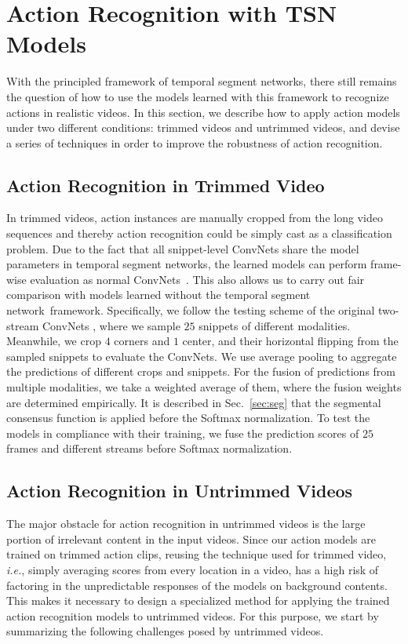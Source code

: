 \documentclass[10pt,journal,compsoc]{IEEEtran}
\newcommand{\SEGNET}{temporal segment network}
\begin{document}
\section{Action Recognition with TSN Models}

With the principled framework of \SEGNET s, there still remains the question of how to use the models learned with this framework to recognize actions in realistic videos. In this section, we describe how to apply action models under two different conditions: trimmed videos and untrimmed videos, and devise a series of techniques in order to improve the robustness of action recognition. 

\subsection{Action Recognition in Trimmed Video}
In trimmed videos, action instances are manually cropped from the long video sequences and thereby action recognition could be simply cast as a classification problem.   
Due to the fact that all snippet-level ConvNets share the model parameters in \SEGNET s, the learned models can perform frame-wise evaluation as normal ConvNets~\cite{SimonyanZ14}.
This also allows us to carry out fair comparison with models learned without the \SEGNET~framework. 
Specifically, we follow the testing scheme of the original two-stream ConvNets \cite{SimonyanZ14}, where we sample $ 25 $ snippets of different modalities. Meanwhile, we crop $ 4 $ corners and $ 1 $ center, and their horizontal flipping from the sampled snippets to evaluate the ConvNets. We use average pooling to aggregate the predictions of different crops and snippets.
For the fusion of predictions from multiple modalities, we take a weighted average of them, where the fusion weights are determined empirically.
It is described in Sec.~\ref{sec:seg} that the segmental consensus function is applied before the Softmax normalization.
To test the models in compliance with their training, we fuse the prediction scores of $ 25 $ frames and different streams before Softmax normalization.

\subsection{Action Recognition in Untrimmed Videos}
\label{sec:untrimmed}

The major obstacle for action recognition in untrimmed videos is the large portion of irrelevant content in the input videos.
Since our action models are trained on trimmed action clips, reusing the technique used for trimmed video, \emph{i.e.}, simply averaging scores from every location in a video, has a high risk of factoring in the unpredictable responses of the models on background contents. 
This makes it necessary to design a specialized method for applying the trained action recognition models to untrimmed videos.
For this purpose, we start by summarizing the following challenges posed by untrimmed videos.
\end{document}
